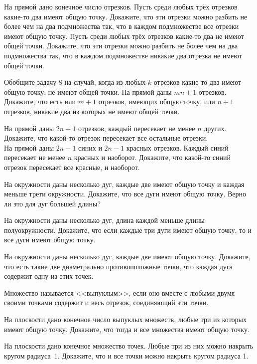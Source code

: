 \documentclass[a4paper, 12pt]{article}
\begin{document}
На прямой дано конечное число отрезков.
 Пусть среди любых трёх отрезков какие-то два имеют общую точку. Докажите, что эти отрезки можно разбить не более чем на два подмножества так, что в каждом подмножестве все отрезки имеют общую точку.
 Пусть среди любых трёх отрезков какие-то два не имеют общей точки. Докажите, что эти отрезки можно разбить не более чем на два подмножества так, что в каждом подмножестве никакие два отрезка не имеют общей точки.

Обобщите задачу 8 на случай, когда из любых $k$ отрезков какие-то два  имеют общую точку;
 не имеют общей точки.
 На прямой даны $mn+1$ отрезков. Докажите, что есть или $m+1$ отрезков, имеющих общую точку, или $n+1$ отрезков,
никакие два из которых не имеют общей точки.

 На прямой даны $2n+1$ отрезков, каждый пересекает не менее $n$ других. Докажите, что какой-то отрезок пересекает все остальные отрезки.\\
 На прямой даны $2n-1$ синих и $2n-1$ красных отрезков. Каждый синий пересекает не менее $n$ красных и наоборот. Докажите, что какой-то синий отрезок пересекает все красные, и наоборот.

На окружности даны несколько дуг, каждые две имеют общую точку и каждая меньше трети окружности. Докажите, что все дуги имеют общую точку. Верно ли это для дуг большей длины?

На окружности даны несколько дуг, длина каждой меньше длины полуокружности. Докажите, что если каждые три дуги имеют общую точку, то и все дуги имеют общую точку.

На окружности даны несколько дуг, каждые две имеют общую точку. Докажите, что есть такие две диаметрально противоположные точки, что каждая дуга содержит одну из этих точек.


\vspace*{-1mm}
Множество называется <<выпуклым>>, если оно вместе с любыми двумя своими точками содержит и весь отрезок, соединяющий эти точки.

 На плоскости дано конечное число выпуклых множеств, любые три из которых имеют общую точку. Докажите, что тогда и все множества имеют общую точку.

На плоскости дано конечное множество точек. Любые три из них можно накрыть кругом радиуса~1. Докажите, что и все точки можно накрыть кругом радиуса 1.
\end{document}
